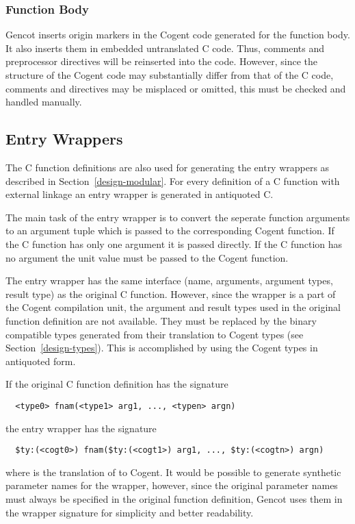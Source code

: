 \subsubsection{Function Body}

Gencot inserts origin markers in the Cogent code generated for the function body. It also inserts them in embedded 
untranslated C code. Thus, comments and preprocessor directives will be reinserted into the code. However, since the
structure of the Cogent code may substantially differ from that of the C code, comments and directives may be misplaced 
or omitted, this must be checked and handled manually.

\subsection{Entry Wrappers}
\label{design-fundefs-wrapper}

The C function definitions are also used for generating the entry wrappers as described in Section~\ref{design-modular}.
For every definition of a C function with external linkage an entry wrapper is generated in antiquoted C.

The main task of the entry wrapper is to convert the seperate function arguments to an argument tuple which is passed
to the corresponding Cogent function. If the C function has only one argument it is passed directly. If the C 
function has no argument the unit value must be passed to the Cogent function.

The entry wrapper has the same interface (name, arguments, argument types, result type) as the original C function.
However, since the wrapper is a part of the Cogent compilation unit, the argument and result types used in the 
original function definition are not available. They must be replaced by the binary compatible types generated 
from their translation to Cogent types (see Section~\ref{design-types}). This is accomplished by using the Cogent
types in antiquoted form.

If the original C function definition has the signature
\begin{verbatim}
  <type0> fnam(<type1> arg1, ..., <typen> argn)
\end{verbatim}
the entry wrapper has the signature
\begin{verbatim}
  $ty:(<cogt0>) fnam($ty:(<cogt1>) arg1, ..., $ty:(<cogtn>) argn)
\end{verbatim}
where  is the translation of  to Cogent. It would be possible to generate synthetic 
parameter names for the wrapper, however, since the original parameter names must always be specified in the 
original function definition, Gencot uses them in the wrapper signature for simplicity and better readability.

